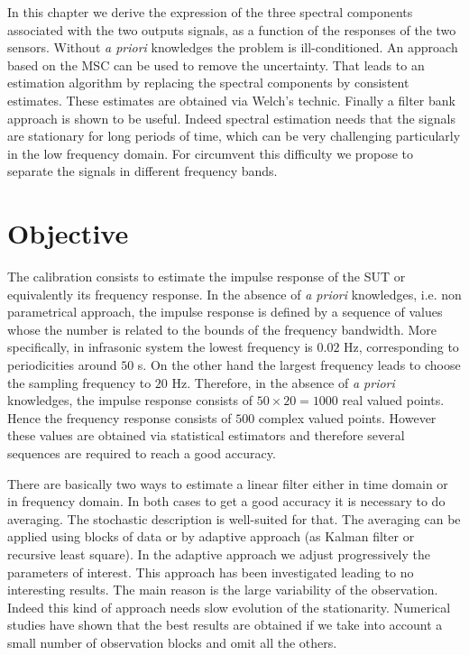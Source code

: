 

In this chapter we derive the expression of the three spectral components associated with the two outputs signals, as a function of the responses of the two sensors. Without \emph{a priori} knowledges  the problem is ill-conditioned. An approach based on the MSC can be used to remove the uncertainty. That leads to an estimation algorithm by replacing the spectral components by consistent estimates. These estimates are obtained via Welch's technic. Finally a filter bank approach is shown to be useful. Indeed spectral estimation  needs that the signals are stationary for long periods of time, which can be  very challenging particularly in the low frequency domain. For circumvent this difficulty we propose to separate the signals in different frequency bands.

\section{Objective}
The calibration consists to estimate the impulse response of the SUT or equivalently its frequency response. In the absence of {\it a priori} knowledges, i.e. non parametrical approach, the impulse response is defined by a sequence of values whose the number is related to the bounds of the frequency bandwidth. More specifically, in infrasonic system the lowest frequency is $0.02$ Hz, corresponding to periodicities around $50$ s. On the other hand the largest frequency leads to choose the sampling frequency to $20$ Hz. Therefore, in the absence of {\it a priori} knowledges, the impulse response consists of $50\times 20=1000$ real valued points. Hence the frequency response consists of $500$ complex valued points. However these values are obtained via statistical estimators and therefore several sequences  are required to reach a good accuracy.

There are basically two ways to estimate a linear filter either in time domain or in frequency domain. In both cases to get a good accuracy it is necessary to do averaging. The stochastic description is well-suited for that. The averaging can be applied using blocks of data or by adaptive approach (as Kalman filter or recursive least square). In the adaptive approach we adjust progressively the parameters of interest. This approach has been investigated leading to no interesting results. The main reason is the large variability of the observation. Indeed this kind of approach needs slow evolution of the stationarity. Numerical studies have shown that the best results are obtained if we take into account a small number of observation blocks and omit all the others.

